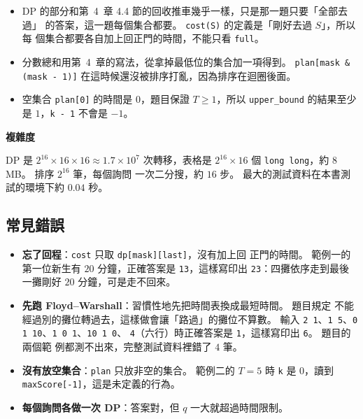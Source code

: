 
\begin{itemize}
\item DP 的部分和第~4~章 4.4 節的回收推車幾乎一樣，只是那一題只要「全部去過」
的答案，這一題每個集合都要。 \texttt{cost(S)} 的定義是「剛好去過 $S$」，所以每
個集合都要各自加上回正門的時間，不能只看 \texttt{full}。
\item 分數總和用第~4~章的寫法，從拿掉最低位的集合加一項得到。 \texttt{plan[mask
\& (mask - 1)]} 在這時候還沒被排序打亂，因為排序在迴圈後面。
\item 空集合 \texttt{plan[0]} 的時間是 $0$，題目保證 $T \ge 1$，所以
\texttt{upper\_bound} 的結果至少是 $1$，\texttt{k - 1} 不會是 $-1$。
\end{itemize}

\textbf{複雜度}

DP 是 $2^{16} \times 16 \times 16 \approx 1.7 \times 10^7$ 次轉移，表格是
$2^{16} \times 16$ 個 \texttt{long long}，約 $8$ MB。 排序 $2^{16}$ 筆，每個詢問
一次二分搜，約 $16$ 步。 最大的測試資料在本書測試的環境下約 $0.04$ 秒。

\subsection{常見錯誤}

\begin{itemize}
\item \textbf{忘了回程}：\texttt{cost} 只取 \texttt{dp[mask][last]}，沒有加上回
正門的時間。 範例一的第一位新生有 $20$ 分鐘，正確答案是 \texttt{13}，這樣寫印出
\texttt{23}：四攤依序走到最後一攤剛好 $20$ 分鐘，可是走不回來。
\item \textbf{先跑 Floyd--Warshall}：習慣性地先把時間表換成最短時間。 題目規定
不能經過別的攤位轉過去，這樣做會讓「路過」的攤位不算數。 輸入
\texttt{2 1}、\texttt{1 5}、\texttt{0 1 10}、\texttt{1 0 1}、\texttt{10 1 0}、
\texttt{4}（六行）時正確答案是 \texttt{1}，這樣寫印出 \texttt{6}。 題目的兩個範
例都測不出來，完整測試資料裡錯了 $4$ 筆。
\item \textbf{沒有放空集合}：\texttt{plan} 只放非空的集合。 範例二的 $T = 5$ 時
\texttt{k} 是 $0$，讀到 \texttt{maxScore[-1]}，這是未定義的行為。
\item \textbf{每個詢問各做一次 DP}：答案對，但 $q$ 一大就超過時間限制。
\end{itemize}

